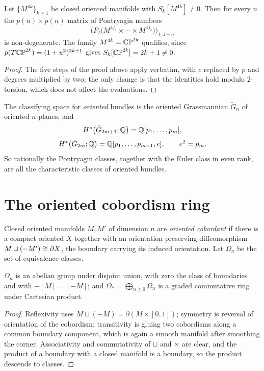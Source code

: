 \begin{theorem}\label{thm:pontryagin-matrix}
Let $\{M^{4k}\}_{k\ge1}$ be closed oriented manifolds with $S_k[M^{4k}]\neq0$.
Then for every $n$ the $p(n)\times p(n)$ matrix of Pontryagin numbers
\[
\Big(P_I\big(M^{4j_1}\times\cdots\times M^{4j_s}\big)\Big)_{I,J\vdash n}
\]
is non-degenerate. The family $M^{4k}=\mathbb{CP}^{2k}$ qualifies, since
$p(T\mathbb{CP}^{2k})=(1+u^2)^{2k+1}$ gives $S_k[\mathbb{CP}^{2k}]=2k+1\neq0$.
\end{theorem}

\begin{proof}
The five steps of the proof above apply verbatim, with $c$ replaced by $p$ and
degrees multiplied by two; the only change is that the identities hold modulo
$2$-torsion, which does not affect the evaluations.
\end{proof}

\begin{remark}[quoted]
The classifying space for \emph{oriented} bundles is the oriented Grassmannian
$\tilde G_n$ of oriented $n$-planes, and
\[
H^*\big(\tilde G_{2m+1};\mathbb{Q}\big)=\mathbb{Q}[p_1,\dots,p_m],
\]
\[
H^*\big(\tilde G_{2m};\mathbb{Q}\big)=\mathbb{Q}[p_1,\dots,p_{m-1},e],
\qquad e^2=p_m .
\]
So rationally the Pontryagin classes, together with the Euler class in even
rank, are all the characteristic classes of oriented bundles.
\end{remark}

\section{The oriented cobordism ring}

\begin{definition}
Closed oriented manifolds $M,M'$ of dimension $n$ are \emph{oriented cobordant}
if there is a compact oriented $X$ together with an orientation preserving
diffeomorphism $M\sqcup(-M')\cong\partial X$, the boundary carrying its induced
orientation. Let $\Omega_n$ be the set of equivalence classes.
\end{definition}

\begin{proposition}
$\Omega_n$ is an abelian group under disjoint union, with zero the class of
boundaries and with $-[M]=[-M]$; and
$\Omega_*=\bigoplus_{n\ge0}\Omega_n$ is a graded commutative ring under
Cartesian product.
\end{proposition}

\begin{proof}
Reflexivity uses $M\sqcup(-M)=\partial(M\times[0,1])$; symmetry is reversal of
orientation of the cobordism; transitivity is gluing two cobordisms along a
common boundary component, which is again a smooth manifold after smoothing the
corner. Associativity and commutativity of $\sqcup$ and $\times$ are clear, and
the product of a boundary with a closed manifold is a boundary, so the product
descends to classes.
\end{proof}


